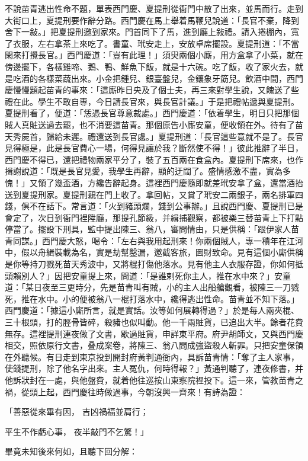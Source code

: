 \begin{showcontents}{}
不說苗青逃出性命不題，單表西門慶、夏提刑從衙門中散了出來，並馬而行。走到大街口上，夏提刑要作辭分路。西門慶在馬上舉着馬鞭兒說道：「長官不棄，降到舍下一敍。」把夏提刑邀到家來。門首同下了馬，進到廳上敍禮。請入捲棚內，寬了衣服，左右拿茶上來吃了。書童、玳安走上，安放卓席擺設。夏提刑道：「不當閑來打攪長官。」西門慶道：「豈有此理！」須臾兩個小廝，用方盒拿了小菜，就在傍邊擺下，各樣雞啼、鵝、鴨、鮮魚下飯，就是十六碗。吃了飯，收了家火去，就是吃酒的各樣菜蔬出來。小金把鍾兒、銀臺盤兒，金鑲象牙筯兒。飲酒中間，西門慶慢慢題起苗青的事來：「這廝昨日央及了個士夫，再三來對學生說，又餽送了些禮在此。學生不敢自專，今日請長官來，與長官計議。」于是把禮帖遞與夏提刑。夏提刑看了，便道：「恁憑長官尊意裁處。」西門慶道：「依着學生，明日只把那個賊人真賍送過去罷，也不消要這苗青。那個原告小廝安童，便收領在外。待有了苗天秀屍首，歸給未遲。禮還送到長官處。」夏提刑道：「長官這些意就不是了。長官見得極是，此是長官費心一場，何得見讓於我？斷然使不得！」彼此推辭了半日，西門慶不得已，還把禮物兩家平分了，裝了五百兩在食盒內。夏提刑下席來，也作揖謝說道：「既是長官見愛，我學生再辭，顯的迂闊了。盛情感激不盡，實為多愧！」又領了幾盃酒，方纔告辭起身。這裡西門慶隨即就差玳安拿了盒，還當酒抬送到夏提刑家。夏提刑親在門上收了。拿回帖，又賞了玳安二兩銀子，兩名排軍四錢，俱不在話下。常言道：「火到豬頭爛，錢到公事辦。」且說西門慶、夏提刑已是會定了，次日到衙門裡陞廳，那提孔節級，并緝捕觀察，都被樂三替苗青上下打點停當了。擺設下刑具，監中提出陳三、翁八，審問情由，只是供稱：「跟伊家人苗青同謀。」西門慶大怒，喝令：「左右與我用起刑來！你兩個賊人，專一積年在江河中，假以舟緝裝載為名，實是劫幫鑿漏，邀截客旅，圖財致命。見有這個小廝供稱是你等持刀戮死苗天秀波中，又將棍打傷他落水。見有他主人衣服存證，你如何抵頭賴別人？」因把安童提上來，問道：「是誰剌死你主人，推在水中來？」安童道：「某日夜至三更時分，先是苗青叫有賊，小的主人出船艙觀看，被陳三一刀戮死，推在水中。小的便被翁八一棍打落水中，纔得逃出性命。苗青並不知下落。」西門慶道：「據這小廝所言，就是實話。汝等如何展轉得過？」於是每人兩夾棍、三十根頭，打的脛骨皆碎，殺豬也似叫動。他一千兩賍貨，已追出大半。餘者花費無存。這裡提刑連夜做了文書，歇過賍貨，申詳東平府。府尹胡師文，又與西門慶相交，照依原行文書，叠成案卷，將陳三、翁八問成強盜殺人斬罪。只把安童保領在外聽候。有日走到東京投到開封府黃判通衙內，具訴苗青情：「奪了主人家事，使錢提刑，除了他名字出來。主人冤仇，何時得報？」黃通判聽了，連夜修書，并他訴狀封在一處，與他盤費，就着他往巡按山東察院裡投下。這一來，管教苗青之禍，從頭上起，西門慶往時做過事，今朝沒興一齊來！有詩為證：

「善惡從來畢有因，  吉凶禍福並肩行；

平生不作虧心事，  夜半敲門不乞驚！」

畢竟未知後來何如，且聽下回分解：




\end{showcontents}


